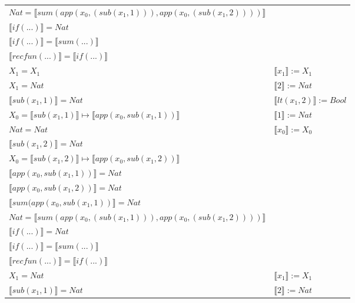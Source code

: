\begin{exercise}
\begin{description}
\begin{center}
\begin{longtable}{ | l | l | }
                        $Nat =  \llbracket sum(app(x_0, (sub(x_1,1))), app(x_0, (sub(x_1,2)))) \rrbracket$ & \\
                        $ \llbracket if(...) \rrbracket = Nat$ & \\
                        $ \llbracket if(...) \rrbracket =  \llbracket sum(...) \rrbracket$ & \\
                        $ \llbracket recfun(...) \rrbracket =   \llbracket if(...) \rrbracket$ & \\
                    \hline
                        $X_1 = X_1$ & $ \llbracket x_1 \rrbracket := X_1$ \\
                        $X_1 = Nat$ & $ \llbracket 2 \rrbracket := Nat$ \\
                        $ \llbracket sub(x_1,1) \rrbracket = Nat$ & $ \llbracket lt(x_1 , 2) \rrbracket := Bool$  \\
                        $X_0 =  \llbracket sub(x_1,1) \rrbracket \mapsto  \llbracket app(x_0, sub(x_1,1)) \rrbracket$ &  $ \llbracket 1 \rrbracket := Nat$\\
                        $Nat = Nat$ & $ \llbracket x_0 \rrbracket := X_0$ \\
                        $ \llbracket sub(x_1,2) \rrbracket = Nat$ & \\
                        $X_0 =  \llbracket sub(x_1,2) \rrbracket \mapsto  \llbracket app(x_0, sub(x_1,2)) \rrbracket$ & \\
                        $ \llbracket app(x_0, sub(x_1,1)) \rrbracket = Nat$ & \\
                        $ \llbracket app(x_0, sub(x_1,2)) \rrbracket = Nat$ & \\
                        $ \llbracket sum(app(x_0, sub(x_1,1)) \rrbracket = Nat$ & \\
                        $Nat =  \llbracket sum(app(x_0, (sub(x_1,1))), app(x_0, (sub(x_1,2)))) \rrbracket$ & \\
                        $ \llbracket if(...) \rrbracket = Nat$ & \\
                        $ \llbracket if(...) \rrbracket =  \llbracket sum(...) \rrbracket$ & \\
                        $ \llbracket recfun(...) \rrbracket =   \llbracket if(...) \rrbracket$ & \\
                    \hline
                        $X_1 = Nat$ &  $ \llbracket x_1 \rrbracket := X_1$ \\
                        $ \llbracket sub(x_1,1) \rrbracket = Nat$ & $ \llbracket 2 \rrbracket := Nat$ \\

\end{longtable}
\end{center}
\end{description}
\end{exercise}
